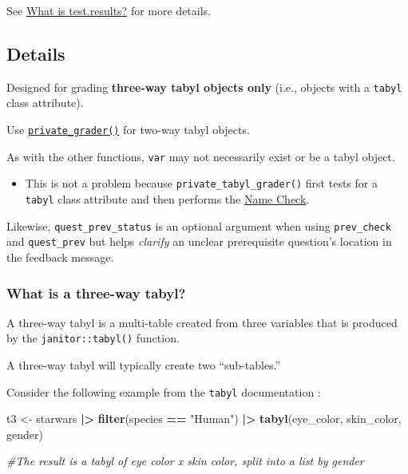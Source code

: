 \documentclass[
  12pt,
]{book}
\newenvironment{Shaded}{\begin{snugshade}}{\end{snugshade}}
\newcommand{\CommentTok}[1]{\textcolor[rgb]{0.56,0.35,0.01}{\textit{#1}}}
\newcommand{\FunctionTok}[1]{\textcolor[rgb]{0.13,0.29,0.53}{\textbf{#1}}}
\newcommand{\NormalTok}[1]{#1}
\newcommand{\OtherTok}[1]{\textcolor[rgb]{0.56,0.35,0.01}{#1}}
\newcommand{\SpecialCharTok}[1]{\textcolor[rgb]{0.81,0.36,0.00}{\textbf{#1}}}
\newcommand{\StringTok}[1]{\textcolor[rgb]{0.31,0.60,0.02}{#1}}
\providecommand{\tightlist}{%
  \setlength{\itemsep}{0pt}\setlength{\parskip}{0pt}}
\begin{document}
See \hyperref[test.results]{What is test.results?} for more details.

\subsection*{Details}\label{details-2}

Designed for grading \textbf{three-way tabyl objects only} (i.e., objects with a \texttt{tabyl} class attribute).

Use \hyperref[private_grader]{\texttt{private\_grader()}} for two-way tabyl objects.

As with the other functions, \texttt{var} may not necessarily exist or be a tabyl object.

\begin{itemize}
\tightlist
\item
  This is not a problem because \texttt{private\_tabyl\_grader()} first tests for a \texttt{tabyl} class attribute and then performs the \hyperref[Name-Check]{Name Check}.
\end{itemize}

Likewise, \texttt{quest\_prev\_status} is an optional argument when using \texttt{prev\_check} and \texttt{quest\_prev} but helps \emph{clarify} an unclear prerequisite question's location in the feedback message.

\subsubsection*{What is a three-way tabyl?}\label{three-way_tabyl}

A three-way tabyl is a multi-table created from three variables that is produced by the \texttt{janitor::tabyl()} function.

A three-way tabyl will typically create two ``sub-tables.''

Consider the following example from the \texttt{tabyl} documentation \citep{janitortabyls}:

\begin{Shaded}
\begin{Highlighting}[]
\NormalTok{t3 }\OtherTok{\textless{}{-}}\NormalTok{ starwars }\SpecialCharTok{|\textgreater{}}
  \FunctionTok{filter}\NormalTok{(species }\SpecialCharTok{==} \StringTok{"Human"}\NormalTok{) }\SpecialCharTok{|\textgreater{}}
  \FunctionTok{tabyl}\NormalTok{(eye\_color, skin\_color, gender)}

\CommentTok{\#The result is a tabyl of eye color x skin color, split into a list by gender}
\end{Highlighting}
\end{Shaded}
\end{document}

